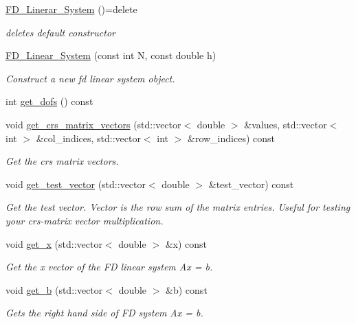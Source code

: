 \begin{DoxyCompactItemize}
\item 
\mbox{\label{classFD__Linear__System_acc7017959d0634a8ea7137b31ddc5b58}} 
\mbox{\hyperlink{classFD__Linear__System_acc7017959d0634a8ea7137b31ddc5b58}{F\+D\+\_\+\+Linerar\+\_\+\+System}} ()=delete
\begin{DoxyCompactList}\small\item\em deletes default constructor \end{DoxyCompactList}\item 
\mbox{\hyperlink{classFD__Linear__System_a468ed4f5d475fdf24a931f8bed1b468d}{F\+D\+\_\+\+Linear\+\_\+\+System}} (const int N, const double h)
\begin{DoxyCompactList}\small\item\em Construct a new fd linear system object. \end{DoxyCompactList}\item 
int \mbox{\hyperlink{classFD__Linear__System_a751694ea10d32e771355bd849851a3e9}{get\+\_\+dofs}} () const
\item 
void \mbox{\hyperlink{classFD__Linear__System_a610566c9c6085bae586f9fe1337fe48c}{get\+\_\+crs\+\_\+matrix\+\_\+vectors}} (std\+::vector$<$ double $>$ \&values, std\+::vector$<$ int $>$ \&col\+\_\+indices, std\+::vector$<$ int $>$ \&row\+\_\+indices) const
\begin{DoxyCompactList}\small\item\em Get the crs matrix vectors. \end{DoxyCompactList}\item 
void \mbox{\hyperlink{classFD__Linear__System_a3af7fbe86ec2e792156d84df7d7b8e6f}{get\+\_\+test\+\_\+vector}} (std\+::vector$<$ double $>$ \&test\+\_\+vector) const
\begin{DoxyCompactList}\small\item\em Get the test vector. Vector is the row sum of the matrix entries. Useful for testing your crs-\/matrix vector multiplication. \end{DoxyCompactList}\item 
void \mbox{\hyperlink{classFD__Linear__System_a3d2155127cc429c97b965867b513b8bf}{get\+\_\+x}} (std\+::vector$<$ double $>$ \&x) const
\begin{DoxyCompactList}\small\item\em Get the x vector of the FD linear system Ax = b. \end{DoxyCompactList}\item 
void \mbox{\hyperlink{classFD__Linear__System_afef1a0fde94661b29aa5f741d52855b1}{get\+\_\+b}} (std\+::vector$<$ double $>$ \&b) const
\begin{DoxyCompactList}\small\item\em Gets the right hand side of FD system Ax = b. \end{DoxyCompactList}\end{DoxyCompactItemize}


